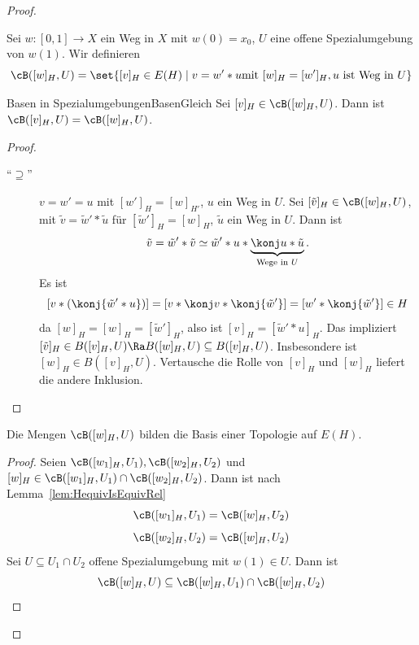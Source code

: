 \documentclass[language=ngerman]{TemplateLecture} %
\begin{document}
\begin{proof}
\begin{description}
\begin{description}


            \item[Topologie auf \(E(H)\)] Sei \(w \colon [0,1] \to X\) ein Weg in \(X\) mit \(w(0) = x_0\), \(U\) eine offene Spezialumgebung von \(w(1)\). Wir definieren
            \[\cB([w]_H, U) = \set{[v]_H \in E(H) \mid v = w' * u \text{mit } [w]_H = [w']_H,u \text{ ist Weg in } U}\]

            \begin{lem}{Basen in Spezialumgebungen}{BasenGleich}
                Sei \([v]_H \in \cB([w]_H, U)\). Dann ist \(\cB([v]_H, U) = \cB([w]_H, U)\).
            \end{lem}
            \begin{proof}
                \begin{description}
                    \item[\enquote{\(\supseteq\)}] \(v = w' = u\) mit \([w']_H = [w]_{H'}\), \(u\) ein Weg in \(U\).
                    Sei \([\tilde v]_H \in \cB([w]_H, U)\), mit \(\tilde v = \tilde w' * \tilde u\) für \([\tilde w']_H = [w]_H\), \(\tilde u\) ein Weg in \(U\).
                    Dann ist
                    \[\tilde v = \tilde w' * \tilde v \simeq \tilde w' * u* \underbrace{\konj u * \tilde u}_{\text{Wege in } U}.\]
                    Es ist
                    \[[v* (\konj{\tilde w' * u})] = [v * \konj v * \konj{\tilde w '}] = [w'* \konj{\tilde w '}] \in H\]
                    da \([w]_H = [w]_H = [\tilde w']_H\), also ist \([v]_H = [\tilde w' * u]_H\).
                    Das impliziert \([\tilde v]_H \in B([v]_H, U) \Ra B([w]_H, U) \subseteq B([v]_H, U)\). Insbesondere ist \([w]_H \in B([v]_H, U)\). Vertausche die Rolle von \([v]_H\) und \([w]_H\) liefert die andere Inklusion.
                \end{description}
            \end{proof}

            \begin{prop}
                Die Mengen \(\cB([w]_H, U)\) bilden die Basis einer Topologie auf \(E(H)\).
            \end{prop}

            \begin{proof}
                Seien \(\cB([w_1]_H, U_1), \cB([w_2]_H, U_2)\) und \([w]_H \in \cB([w_1]_H, U_1) \cap \cB([w_2]_H, U_2)\). Dann ist nach Lemma~\ref{lem:HequivIsEquivRel}
                \[\cB([w_1]_H, U_1) = \cB([w]_H,U_2)\]
                \[\cB([w_2]_H, U_2) = \cB([w]_H, U_2)\]
                Sei \(U \subseteq U_1 \cap U_2\) offene Spezialumgebung mit \(w(1) \in U\). Dann ist
                \[\cB([w]_H, U) \subseteq \cB([w]_H, U_1) \cap \cB([w]_H, U_2)\]
            \end{proof}


\end{description}
\end{description}
\end{proof}
\end{document}
